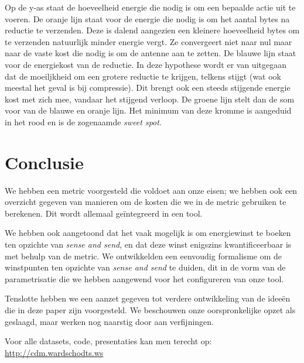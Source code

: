 \documentclass[11pt]{article}
\begin{document}
Op de y-as staat de hoeveelheid energie die nodig is om een bepaalde actie uit te voeren.
De oranje lijn staat voor de energie die nodig is om het aantal bytes na reductie te verzenden. Deze is dalend aangezien een kleinere hoeveelheid bytes om te verzenden natuurlijk minder energie vergt. Ze convergeert niet naar nul maar naar de vaste kost die nodig is om de antenne aan te zetten.
De blauwe lijn staat voor de energiekost van de reductie. In deze hypothese wordt er van uitgegaan dat de moeiljkheid om een grotere reductie te krijgen, telkens stijgt (wat ook meestal het geval is bij compressie). Dit brengt ook een steeds stijgende energie kost met zich mee, vandaar het stijgend verloop.
De groene lijn stelt dan de som voor van de blauwe en oranje lijn. Het minimum van deze kromme is aangeduid in het rood en is de zogenaamde \textit{sweet spot}. 

\section{Conclusie}

We hebben een metric voorgesteld die voldoet aan onze eisen; we hebben ook een
overzicht gegeven van manieren om de kosten die we in de metric gebruiken te
berekenen. Dit wordt allemaal ge\"integreerd in een tool.

We hebben ook aangetoond dat het vaak mogelijk is om energiewinst te boeken ten
opzichte van \textit{sense and send}, en dat deze winst enigszins
kwantificeerbaar is met behulp van de metric. We ontwikkelden een eenvoudig
formalisme om de winstpunten ten opzichte van \textit{sense and send} te duiden,
dit in de vorm van de parametrisatie die we hebben aangewend voor het
configureren van onze tool.

Tenslotte hebben we een aanzet gegeven tot verdere ontwikkeling van de idee\"en
die in deze paper zijn voorgesteld. We beschouwen onze oorspronkelijke opzet als
geslaagd, maar werken nog naarstig door aan verfijningen.

Voor alle datasets, code, presentaties kan men terecht op: \url{http://cdm.wardschodts.ws}


\nocite{*}

\end{document}
